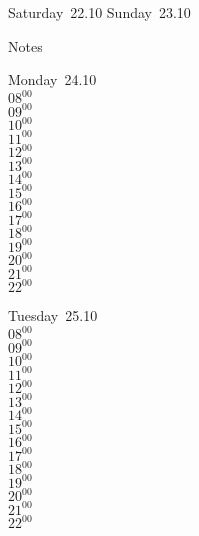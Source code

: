 \documentclass[11pt,a4paper]{book}\usepackage[]{graphicx}\usepackage[]{color}
\begin{document}
\begin{weekendbox}
  Saturday~22.10
  \tcblower
  Sunday~23.10
\end{weekendbox} %
\begin{notebox}
  Notes
\end{notebox}
\clearpage
\begin{headerbox}
\end{headerbox}
\begin{weekdaybox}
  Monday~24.10\\
  { 
  \vfill
  $08^{00}$\\
$09^{00}$\\
$10^{00}$\\
$11^{00}$\\
$12^{00}$\\
$13^{00}$\\
$14^{00}$\\
$15^{00}$\\
$16^{00}$\\
$17^{00}$\\
$18^{00}$\\
$19^{00}$\\
$20^{00}$\\
$21^{00}$\\
$22^{00}$\\
  }
\end{weekdaybox}
\begin{weekdaybox}
  Tuesday~25.10\\
  { 
  \vfill
  $08^{00}$\\
$09^{00}$\\
$10^{00}$\\
$11^{00}$\\
$12^{00}$\\
$13^{00}$\\
$14^{00}$\\
$15^{00}$\\
$16^{00}$\\
$17^{00}$\\
$18^{00}$\\
$19^{00}$\\
$20^{00}$\\
$21^{00}$\\
$22^{00}$\\
  }
\end{weekdaybox}
\end{document}
